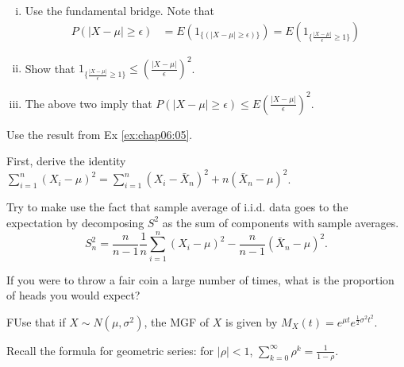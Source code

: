 \begin{Hint}{1.10}
		\begin{enumerate}[i.]
			\item Use the fundamental bridge. Note that
			\begin{equation*}
				\begin{array}{cl}
						P(|X-\mu|\geq \epsilon) &= E(1_{\{\left( |X-\mu|\geq \epsilon\right) \}})= E(1_{\{  \frac{|X-\mu|}{\epsilon}\geq 1  \}})
				\end{array}
			\end{equation*}
		\item Show that $1_{\{ \frac{|X-\mu|}{\epsilon}\geq 1  \}}\leq \left( \frac{|X-\mu|}{\epsilon}\right)^2 $.
		\item The above two imply that $P(|X-\mu|\geq \epsilon)\leq E\left( \frac{|X-\mu|}{\epsilon}\right)^2$.
		\end{enumerate}
	
\end{Hint}
\begin{Hint}{1.12}
			Use the result from Ex \ref{ex:chap06:05}.
		
\end{Hint}
\begin{Hint}{1.13}
			First, derive the identity $\sum_{i = 1}^n (X_i - \mu)^2 = \sum_{i = 1}^n (X_i - \bar{X}_n)^2 + n (\bar{X}_n - \mu)^2$.
		
\end{Hint}
\begin{Hint}{1.14}
		Try to make use the fact that sample average of i.i.d. data goes to the expectation by decomposing $S^2$ as the sum of components with sample averages.  $$S_n^2 = \frac{n}{n - 1}\frac{1}{n} \sum_{i = 1}^n (X_i - \mu)^2 - \frac{n}{n - 1} (\bar{X}_n - \mu)^2.$$
	
\end{Hint}
\begin{Hint}{1.15}
			If you were to throw a fair coin a large number of times, what is the proportion of heads you would expect?
		
\end{Hint}
\begin{Hint}{1.16}
			FUse that if $X \sim N(\mu, \sigma^2)$, the MGF of $X$ is given by $M_X(t) = e^{\mu t} e^{\frac{1}{2} \sigma^2 t^2}$.
		
\end{Hint}
\begin{Hint}{1.18}
			Recall the formula for geometric series: for $|\rho| < 1$, $\sum_{k = 0}^{\infty} \rho^k = \frac{1}{1 - \rho}$.
		
\end{Hint}
